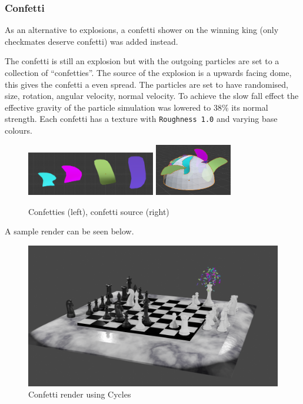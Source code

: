 \documentclass[11pt]{article}
\begin{document}
\subsubsection{Confetti}
\label{sec:orga3868c4}
As an alternative to explosions, a confetti shower on the winning king (only
checkmates deserve confetti) was added instead.

The confetti is still an explosion but with the outgoing particles are set to a
collection of ``confetties''. The source of the explosion is a upwards facing
dome, this gives the confetti a even spread. The particles are set to have
randomised, size, rotation, angular velocity, normal velocity. To achieve the
slow fall effect the effective gravity of the particle simulation was lowered to
38\% its normal strength. Each confetti has a texture with \texttt{Roughness 1.0} and
varying base colours.

\begin{figure}[htbp]
\begin{center}
\includegraphics[width=0.5\textwidth]{Images/confetties.png}
\includegraphics[width=0.3\textwidth]{Images/confetti dome.png}
\end{center}
\caption{Confetties (left), confetti source (right)}
\end{figure}

A sample render can be seen below.
\begin{figure}[htbp]
\centering
\includegraphics[width=\textwidth]{Images/Confetti! cycles.png}
\caption{Confetti render using Cycles}
\end{figure}
\end{document}
